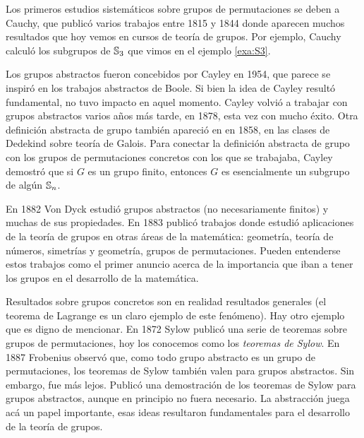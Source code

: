 Los primeros estudios sistemáticos sobre grupos de permutaciones se deben a Cauchy, que publicó varios trabajos entre 1815 y 1844 donde aparecen muchos resultados 
que hoy vemos en cursos de teoría de grupos. Por ejemplo, Cauchy calculó 
los subgrupos de $\mathbb{S}_3$ que vimos en el ejemplo \ref{exa:S3}. 

Los grupos abstractos fueron concebidos por Cayley en 1954, que parece se
inspiró en los trabajos abstractos de Boole. Si bien la idea de Cayley 
resultó fundamental, no tuvo impacto en aquel momento. Cayley volvió a trabajar
con grupos abstractos varios años más tarde, en 1878, esta vez con mucho éxito. 
Otra definición abstracta de grupo 
también apareció en en 1858, en las clases de Dedekind sobre teoría de Galois. Para conectar
la definición abstracta de grupo con los grupos de permutaciones concretos con los que 
se trabajaba, 
Cayley demostró que si $G$ es un grupo finito, entonces
$G$ es esencialmente un subgrupo de algún $\mathbb{S}_n$. 

En 1882 Von Dyck estudió grupos abstractos (no necesariamente finitos) y muchas de sus propiedades. En 1883 publicó trabajos donde estudió aplicaciones de la teoría de
grupos en otras áreas de la matemática: geometría, teoría de números, simetrías y geometría, grupos de permutaciones. Pueden entenderse estos trabajos como el primer anuncio
acerca de la importancia que iban a tener los grupos en el desarrollo de la matemática.  

Resultados sobre grupos concretos son en realidad resultados generales (el teorema de Lagrange es un claro ejemplo de este fenómeno). Hay otro ejemplo que es digno de mencionar. En 1872 Sylow
publicó una serie de teoremas sobre grupos de permutaciones, hoy los conocemos como
los \emph{teoremas de Sylow}. En 1887 Frobenius observó que, como todo grupo abstracto es un grupo de permutaciones, los teoremas de Sylow también valen para grupos abstractos. Sin embargo, fue más lejos. Publicó una demostración de los teoremas de Sylow para grupos abstractos, aunque en principio no fuera necesario. La abstracción juega acá un papel importante, esas ideas resultaron fundamentales 
para el desarrollo de la teoría de grupos. 


